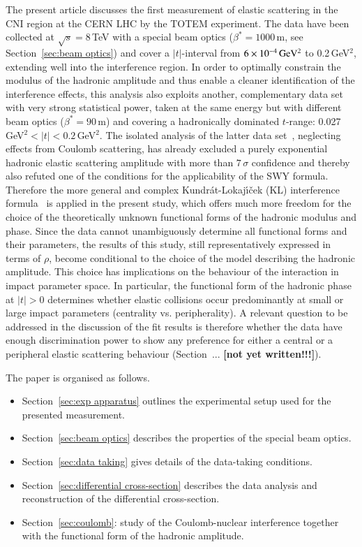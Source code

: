 The present article discusses the first measurement of elastic scattering in the
CNI region at the CERN LHC by the TOTEM experiment. 
The data have been collected at $\sqrt{s} = 8\,$TeV with a special beam optics 
($\beta^{*}=1000\,$m, see Section~\ref{sec:beam optics}) and cover a $|t|$-interval from $6\times10^{-4}\,\rm GeV^{2}$ to 0.2\,GeV$^{2}$, extending well into 
the interference region. 
In order to optimally constrain the modulus of the hadronic amplitude and thus enable a cleaner identification of the interference effects, 
this analysis also exploits another, complementary data set with very strong statistical power, taken at the same energy but with different beam optics ($\beta^{*}=90\,$m) and covering a hadronically dominated $t$-range: 0.027\,GeV$^{2} < |t| < 0.2\,$GeV$^{2}$. The isolated analysis of the
latter data set~\cite{8tev-90m}, neglecting effects from Coulomb scattering, has already excluded a purely exponential hadronic elastic scattering
amplitude with more than $7\,\sigma$ confidence and thereby also refuted
one of the conditions for the applicability of the SWY formula.
Therefore the more general and complex Kundr\'{a}t-Lokaj\'{\i}\v{c}ek (KL) interference 
formula~\cite{kl94} is applied in the present study, which offers much more freedom for the
choice of the theoretically unknown functional forms of the hadronic modulus 
and phase. Since the data cannot unambiguously determine all functional forms and their parameters, the results of this study, still representatively 
expressed in terms of $\rho$, become conditional to the choice of the model 
describing the hadronic amplitude. This choice has implications on the behaviour of the interaction in impact parameter space. In particular, the functional 
form of the hadronic phase at $|t|>0$ determines whether elastic collisions occur predominantly at small or large impact parameters (centrality vs. peripherality). A relevant question to be addressed in the discussion of the fit results is therefore whether the data have enough discrimination power to show any preference for either a central or a peripheral elastic scattering behaviour (Section~... \textbf{[not yet written!!!]}).

The paper is organised as follows.
\begin{itemize}
\item Section~\ref{sec:exp apparatus} outlines the experimental setup used for the presented measurement.
\item Section~\ref{sec:beam optics} describes the properties of the special beam optics.
\item Section~\ref{sec:data taking} gives details of the data-taking conditions.
\item Section~\ref{sec:differential cross-section} describes the data analysis and reconstruction of the differential cross-section.
\item Section~\ref{sec:coulomb}: study of the Coulomb-nuclear interference together with the functional form of the hadronic amplitude.
\end{itemize}

